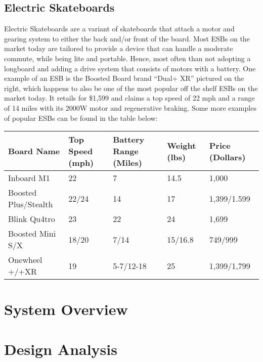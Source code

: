 \documentclass[a4paper,10pt]{article}
\begin{document}
\subsection{Electric Skateboards}
Electric Skateboards are a variant of skateboards that attach a motor and gearing system to either the back and/or front of the board. Most ESBs on the market today are tailored to provide a device that can handle a moderate commute, while being lite and portable. Hence, most often than not adopting a longboard and adding a drive system that consists of motors with a battery. 
One example of an ESB is the Boosted Board brand “Dual+ XR” pictured on the right, which happens to also be one of the most popular off the shelf ESBs on the market today. It retails for \$1,599 and claims a top speed of 22 mph and a range of 14 miles with its 2000W motor and regenerative braking. Some more examples of popular ESBs can be found in the table below:

\begin{tabular}{l l l l l}
Board Name & Top Speed (mph) & Battery Range (Miles) & Weight (lbs) & Price (Dollars) \\\hline
Inboard M1 & 22 & 7 & 14.5 & 1,000 \\
Boosted Plus/Stealth & 22/24 & 14 & 17 & 1,399/1.599 \\
Blink Qu4tro & 23 & 22 & 24 & 1,699 \\
Boosted Mini S/X & 18/20 & 7/14 & 15/16.8 & 749/999 \\
Onewheel +/+XR & 19 & 5-7/12-18 & 25 & 1,399/1,799 \\
\end{tabular}

\section{System Overview}
\section{Design Analysis}
\end{document}
